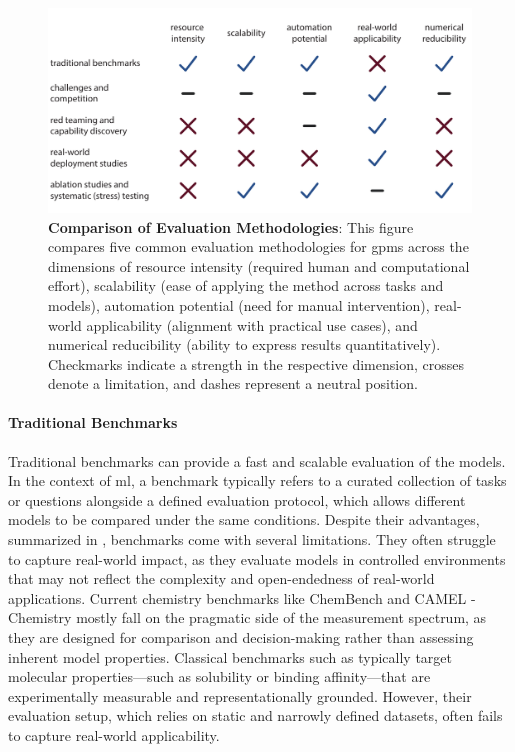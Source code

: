 \begin{figure}
    \centering
    \label{fig:estimators}
    \includegraphics[width=1\textwidth]{figures/rescaled_figures/chemrev_figure10.pdf}
    \caption{\textbf{Comparison of Evaluation Methodologies}: This figure compares five common evaluation methodologies for \glspl{gpm} across the dimensions of resource intensity (required human and computational effort), scalability (ease of applying the method across tasks and models), automation potential (need for manual intervention), real-world applicability (alignment with practical use cases), and numerical reducibility (ability to express results quantitatively). Checkmarks indicate a strength in the respective dimension, crosses denote a limitation, and dashes represent a neutral position.}

\end{figure}

\paragraph{Traditional Benchmarks}\label{para:trad_benchmarks}
Traditional benchmarks can provide a fast and scalable evaluation of the models. In the context of \gls{ml}, a benchmark typically refers to a curated collection of tasks or questions alongside a defined evaluation protocol, which allows different models to be compared under the same conditions. 
Despite their advantages, summarized in , benchmarks come with several limitations. They often struggle to capture real-world impact, as they evaluate models in controlled environments that may not reflect the complexity and open-endedness of real-world applications. Current chemistry benchmarks like ChemBench\autocite{mirza2024large} and CAMEL - Chemistry\autocite{li2023camel} mostly fall on the pragmatic side of the measurement spectrum, as they are designed for comparison and decision-making rather than assessing inherent model properties. 
Classical benchmarks such as  \autocite{wu2018moleculenet} typically target molecular properties---such as solubility or binding affinity---that are experimentally measurable and representationally grounded. However, their evaluation setup, which relies on static and narrowly defined datasets, often fails to capture real-world applicability.

